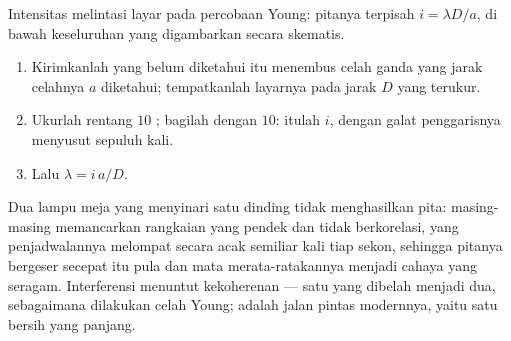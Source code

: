\begin{omfigure}

{\small Intensitas melintasi layar pada percobaan Young: pitanya
terpisah $i = \lambda D/a$, di bawah  keseluruhan yang
digambarkan secara skematis.}
\end{omfigure}

\begin{method}\label{met:g12:light-as-wave:lambda}
\begin{enumerate}
  \item Kirimkanlah  yang belum diketahui itu menembus celah ganda
        yang jarak celahnya $a$ diketahui; tempatkanlah layarnya pada
        jarak $D$ yang terukur.
  \item Ukurlah rentang $10$ ; bagilah dengan $10$:
        itulah  $i$, dengan galat penggarisnya
        menyusut sepuluh kali.
  \item Lalu $\lambda = i\,a/D$.
\end{enumerate}
\end{method}

\begin{remark}\label{rem:g12:light-as-wave:lamps}
Dua lampu meja yang menyinari satu dinding tidak menghasilkan pita:
masing-masing memancarkan rangkaian  yang pendek dan tidak
berkorelasi, yang penjadwalannya melompat secara acak semiliar kali tiap
sekon, sehingga pitanya bergeser secepat itu pula dan mata
merata-ratakannya menjadi cahaya yang seragam. Interferensi menuntut
kekoherenan --- satu  yang dibelah menjadi dua, sebagaimana
dilakukan celah Young;  adalah jalan pintas modernnya, yaitu satu
 bersih yang panjang.
\end{remark}

